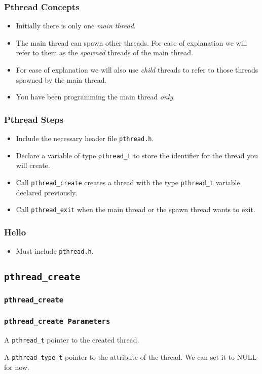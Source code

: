 \documentclass{beamer}
\begin{document}
\begin{frame}
\frametitle{Pthread Concepts}
\begin{itemize}
\item Initially there is only one {\em main thread}.
\item The main thread can spawn other threads.  For ease of
  explanation we will refer to them as the {\em spawned} threads of
  the main thread.
\item For ease of explanation we will also use {\em child} threads to
  refer to those threads spawned by the main thread.
\item You have been programming the main thread {\em only}.
\end{itemize}
\end{frame}


\begin{frame}
\frametitle{Pthread Steps}
\begin{itemize}
\item Include the necessary header file {\tt pthread.h}.
\item Declare a variable of type {\tt pthread\_t} to store the
  identifier for the thread you will create.
\item Call {\tt pthread\_create} creates a thread with the type
  {\tt pthread\_t} variable declared previously.
\item Call {\tt pthread\_exit} when the main thread or the spawn
  thread wants to exit.
\end{itemize}
\end{frame}


\begin{frame}
\frametitle{Hello}
\begin{itemize}
\item Must include {\tt pthread.h}.
\end{itemize}
\end{frame}

\subsection{\tt pthread\_create}

\begin{frame}
\frametitle{\tt pthread\_create}
\end{frame}

\begin{frame}
\frametitle{\tt pthread\_create Parameters}
\begin{description}[l]
\item[\tt thread] A {\tt pthread\_t} pointer to the created thread.
\item[\tt attr] A {\tt pthread\_type\_t} pointer to the attribute of the
  thread.  We can set it to NULL for now.
\end{description}
\end{frame}
\end{document}
